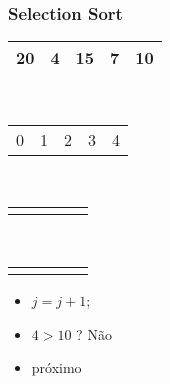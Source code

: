 \documentclass{beamer}
\begin{document}
\begin{frame}
    \frametitle{Selection Sort}
    \begin{center}
        \begin{table}
            \begin{tabular}{| p{0.25cm} | p{0.25cm} | p{0.25cm} | p{0.25cm} | p{0.25cm} |}
                \hline
                20 & 4 & 15 & 7 & 10 \\ \hline
            \end{tabular} \\
            \begin{tabular}{p{0.25cm} p{0.25cm} p{0.25cm} p{0.25cm} p{0.25cm}}
                0 & 1 & 2 & 3 & 4
            \end{tabular} \\
            \begin{tabular}{p{0.25cm} p{0.25cm} p{0.25cm} p{0.25cm} p{0.25cm}}
                \color{blue}{$\uparrow$} & & & \color{red}{$\uparrow$} &
            \end{tabular} \\
            \begin{tabular}{p{0.25cm} p{0.25cm} p{0.25cm} p{0.25cm} p{0.25cm}}
                \color{blue}{i} & & & \color{red}{j} &
            \end{tabular}
        \end{table}
	\end{center}
    \color{green}{$troca = 1$}
    \begin{itemize}[<+->]
        \item $j = j + 1$;
        \item $4 > 10$ ? Não
        \item próximo
    \end{itemize}
\end{frame}
\end{document}
